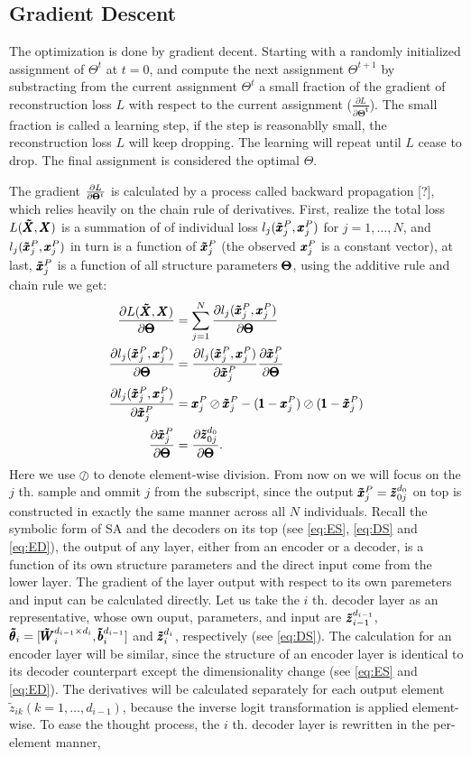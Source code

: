 \subsection{Gradient Descent}
The optimization is done by gradient decent. Starting with a randomly initialized assignment of $\Theta^t$ at $t=0$, and compute the next assignment $\Theta^{t+1}$ by substracting from the current assignment $\Theta^t$ a small fraction of the gradient of reconstruction loss $L$ with respect to the current assignment ($\frac{\partial L}{\partial \boldsymbol{\Theta^{t}}}$). The small fraction is called a learning step, if the step is reasonablly small, the reconstruction loss $L$ will keep dropping. The learning will repeat until $L$ cease to drop. The final assignment is considered the optimal $\Theta$. 

The gradient $\frac{\partial L}{\partial \pmb{\Theta}^t}$ is calculated by a process called backward propagation [?], which relies heavily on the chain rule of derivatives. 
First, realize the total loss $L(\pmb{\tilde{X}}, \pmb{X})$ is a summation of  of individual loss $l_j(\pmb{\tilde{x}}_j^P, \pmb{x}_j^P)$ for $j=1, \dots, N$, and $l_j(\pmb{\tilde{x}}_j^P, \pmb{x}_j^P)$ in turn is a function of $\pmb{\tilde{x}}_j^P$ (the observed $\pmb{x}_j^P$ is a constant vector), at last, $\pmb{\tilde{x}}_j^P$ is a function of all structure parameters $\pmb{\Theta}$, using the additive rule and chain rule we get:
\begin{equation*}
\begin{split}
  \frac{\partial L(\pmb{\tilde{X}}, \pmb{X})}{\partial \pmb{\Theta}} &= \sum_{j=1}^{N}\frac{\partial l_j(\pmb{\tilde{x}}_j^P, \pmb{x}_j^P)}{\partial \pmb{\Theta}} \\
  \frac{\partial l_j(\pmb{\tilde{x}}_j^P, \pmb{x}_j^P)}{\partial \pmb{\Theta}} &= \frac{\partial l_j(\pmb{\tilde{x}}_j^P, \pmb{x}_j^P)}{\partial \pmb{\tilde{x}}_j^P} \frac{\partial \pmb{\tilde{x}}_j^P}{\partial \pmb{\Theta}} \\
  \frac{\partial l_j(\pmb{\tilde{x}}_j^P, \pmb{x}_j^P)}{\partial \pmb{\tilde{x}}_j^P} &= \pmb{x}_j^P \oslash \pmb{\tilde{x}}_j^P - (\pmb{1} - \pmb{x}_j^P) \oslash (\pmb{1} - \pmb{\tilde{x}}_j^P) \\
  \frac{\partial \pmb{\tilde{x}}_j^P}{\partial \pmb{\Theta}} &= \frac{\partial \pmb{\tilde{z}}_{0j}^{d_0}}{\partial \pmb{\Theta}}.
\end{split}
\end{equation*}
Here we use $\oslash$ to denote element-wise division. From now on we will focus on the $j$ th. sample and ommit $j$ from the subscript, since the output $\pmb{\tilde{x}}_j^P = {\pmb{\tilde{z}}_{0j}^{d_{0}}}$ on top is constructed in exactly the same manner across all $N$ individuals. Recall the symbolic form of SA and the decoders on its top (see \ref{eq:ES}, \ref{eq:DS} and \ref{eq:ED}), the output of any layer, either from an encoder or a decoder, is a function of its own structure parameters and the direct input come from the lower layer. The gradient of the layer output with respect to its own paremeters and input can be calculated directly. Let us take the $i$ th. decoder layer as an representative, whose own ouput, parameters, and input are ${\pmb{\tilde{z}}_{i-1}^{d_{i-1}}}$, $\pmb{\tilde{\theta}}_{i}=[\pmb{\tilde{W}}_{i}^{d_{i-1} \times d_{i}}, \pmb{\tilde{b}}_{i}^{d_{i-1}}]$ and ${\pmb{\tilde{z}}_{i}^{d_{i}}}$, respectively (see \ref{eq:DS}). The calculation for an encoder layer will be similar, since the structure of an encoder layer is identical to its decoder counterpart except the dimensionality change (see \ref{eq:ES} and \ref{eq:ED}). The derivatives will be calculated separately for each output element $\tilde{z}_{ik} (k=1,\dots,d_{i-1})$, because the inverse logit transformation is applied element-wise. To ease the thought process, the $i$ th. decoder layer is rewritten in the per-element manner,

